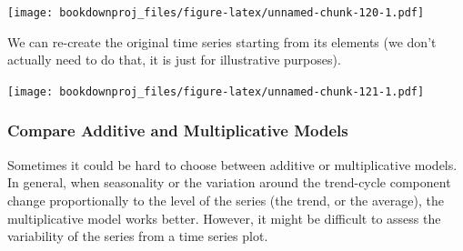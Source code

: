 \documentclass[
]{article}
\newenvironment{Shaded}{\begin{snugshade}}{\end{snugshade}}
\newcommand{\DataTypeTok}[1]{\textcolor[rgb]{0.13,0.29,0.53}{#1}}
\newcommand{\DecValTok}[1]{\textcolor[rgb]{0.00,0.00,0.81}{#1}}
\newcommand{\KeywordTok}[1]{\textcolor[rgb]{0.13,0.29,0.53}{\textbf{#1}}}
\newcommand{\NormalTok}[1]{#1}
\newcommand{\OperatorTok}[1]{\textcolor[rgb]{0.81,0.36,0.00}{\textbf{#1}}}
\newcommand{\StringTok}[1]{\textcolor[rgb]{0.31,0.60,0.02}{#1}}
\begin{document}
\texttt{[image: bookdownproj\_files/figure-latex/unnamed-chunk-120-1.pdf]}

We can re-create the original time series starting from its elements (we don't actually need to do that, it is just for illustrative purposes).

\begin{Shaded}
\end{Shaded}

\texttt{[image: bookdownproj\_files/figure-latex/unnamed-chunk-121-1.pdf]}

\hypertarget{compare-additive-and-multiplicative-models}{%
\subsubsection{Compare Additive and Multiplicative Models}\label{compare-additive-and-multiplicative-models}}

Sometimes it could be hard to choose between additive or multiplicative models. In general, when seasonality or the variation around the trend-cycle component change proportionally to the level of the series (the trend, or the average), the multiplicative model works better. However, it might be difficult to assess the variability of the series from a time series plot.
\end{document}
